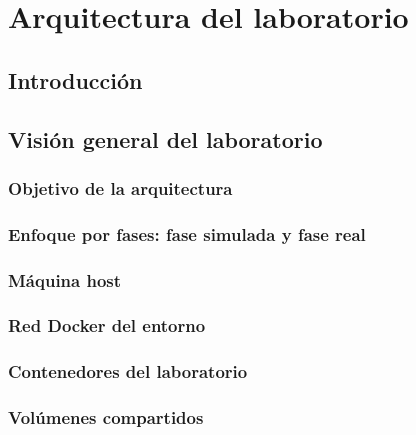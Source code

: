 %
%

\chapter{Arquitectura del laboratorio}
\label{cha:arquitectura-laboratorio}

\section{Introducción}
\label{sec:introduccion-arquitectura-laboratorio}


\section{Visión general del laboratorio}
\label{sec:vision-general-laboratorio}

\subsection{Objetivo de la arquitectura}
\label{subsec:objetivo-arquitectura}

\subsection{Enfoque por fases: fase simulada y fase real}
\label{subsec:enfoque-fases-simulada-real}

\subsection{Máquina host}
\label{subsec:maquina-host}

\subsection{Red Docker del entorno}
\label{subsec:red-docker-entorno}

\subsection{Contenedores del laboratorio}
\label{subsec:contenedores-laboratorio}

\subsection{Volúmenes compartidos}
\label{subsec:volumenes-compartidos}

